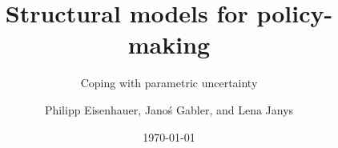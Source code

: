 
\title{Structural models for policy-making}
\subtitle{Coping with parametric uncertainty}
\author{Philipp Eisenhauer, Janoś Gabler, and Lena Janys}
\date{\today}

\begin{frame}[standout]{~}\titlepage\end{frame}
